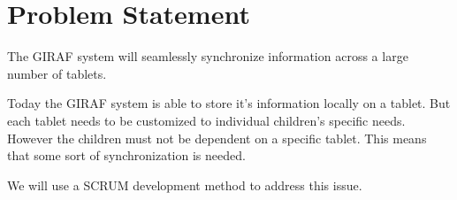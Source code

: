 \section{Problem Statement}
The GIRAF system will seamlessly synchronize information across a large number of tablets.

Today the GIRAF system is able to store it's information locally on a tablet. But each tablet needs to be customized to individual children's specific needs. However the children must not be dependent on a specific tablet. This means that some sort of synchronization is needed. 

We will use a SCRUM development method to address this issue.





